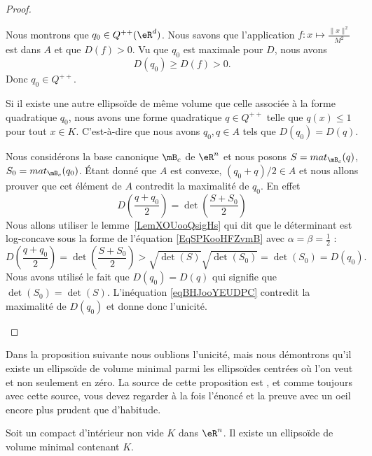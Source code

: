 \begin{proof}
\begin{subproof}
		Nous montrons que \( q_0\in Q^{++}(\eR^d)\). Nous savons que l'application \( f\colon x\mapsto \frac{ \| x \|^2 }{ M^2 }\) est dans \( A\) et que \( D(f)>0\). Vu que \( q_0\) est maximale pour \( D\), nous avons
		\begin{equation}
			D(q_0)\geq D(f)>0.
		\end{equation}
		Donc \( q_0\in Q^{++}\).

		\spitem[Unicité]

		Si il existe une autre ellipsoïde de même volume que celle associée à la forme quadratique \( q_0\), nous avons une forme quadratique \( q\in Q^{++}\) telle que \( q(x)\leq 1\) pour tout \( x\in K\). C'est-à-dire que nous avons \( q_0,q\in A\) tels que \( D(q_0)=D(q)\).

		Nous considérons la base canonique \( \mB_c\) de \( \eR^n\) et nous posons \( S=mat_{\mB_c}(q)\), \( S_0=mat_{\mB_c}(q_0)\). Étant donné que \( A\) est convexe, \( (q_0+q)/2\in A\) et nous allons prouver que cet élément de \( A\) contredit la maximalité de \( q_0\). En effet
		\begin{equation}
			D\left( \frac{ q+q_0 }{ 2 }\right)=\det\left( \frac{ S+S_0 }{2} \right)
		\end{equation}
		Nous allons utiliser le lemme~\ref{LemXOUooQsigHs} qui dit que le déterminant est log-concave sous la forme de l'équation \eqref{EqSPKooHFZvmB} avec \( \alpha=\beta=\frac{ 1 }{2}\) :
		\begin{equation}    \label{eqBHJooYEUDPC}
			D\left( \frac{ q+q_0 }{ 2 }\right)=\det\left( \frac{ S+S_0 }{2} \right)>\sqrt{\det(S)}\sqrt{\det(S_0)}=\det(S_0)=D(q_0).
		\end{equation}
		Nous avons utilisé le fait que \( D(q_0)=D(q)\) qui signifie que \( \det(S_0)=\det(S)\). L'inéquation \eqref{eqBHJooYEUDPC} contredit la maximalité de \( D(q_0)\) et donne donc l'unicité.
	\end{subproof}
\end{proof}

Dans la proposition suivante nous oublions l'unicité, mais nous démontrons qu'il existe un ellipsoïde de volume minimal parmi les ellipsoïdes centrées où l'on veut et non seulement en zéro. La source de cette proposition est \cite{MonCerveau}, et comme toujours avec cette source, vous devez regarder à la fois l'énoncé et la preuve avec un oeil encore plus prudent que d'habitude.
\begin{proposition}      \label{PROPooVIDPooOGrRJh}
	Soit un compact d'intérieur non vide \( K\) dans \( \eR^n\). Il existe un ellipsoïde de volume minimal contenant \( K\).
\end{proposition}

